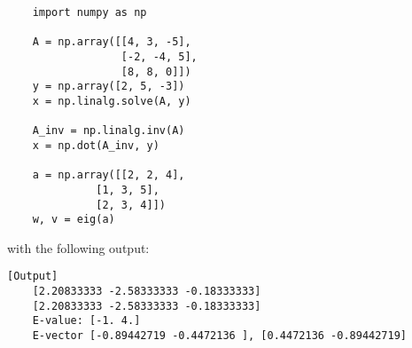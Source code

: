 \documentclass{article}
\begin{document}
\begin{verbatim}
    import numpy as np

    A = np.array([[4, 3, -5], 
                  [-2, -4, 5], 
                  [8, 8, 0]])
    y = np.array([2, 5, -3])
    x = np.linalg.solve(A, y)

    A_inv = np.linalg.inv(A)
    x = np.dot(A_inv, y)

    a = np.array([[2, 2, 4], 
              [1, 3, 5],
              [2, 3, 4]])
    w, v = eig(a)
\end{verbatim}
with the following output:

\begin{verbatim}[Output]
    [2.20833333 -2.58333333 -0.18333333]
    [2.20833333 -2.58333333 -0.18333333]
    E-value: [-1. 4.]
    E-vector [-0.89442719 -0.4472136 ], [0.4472136 -0.89442719]
\end{verbatim}
\end{document}
